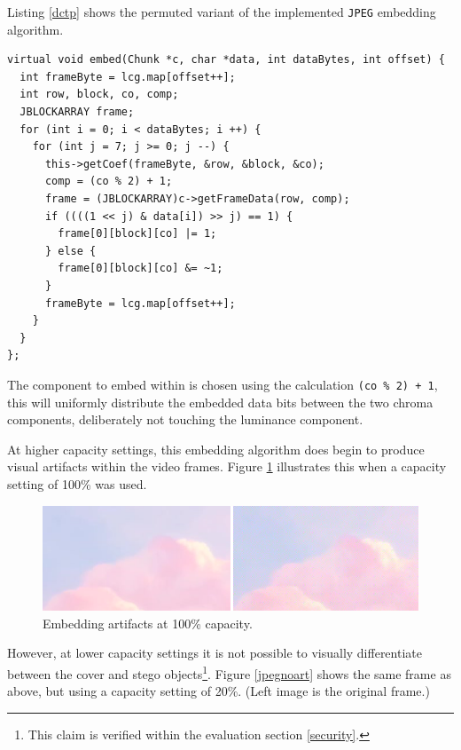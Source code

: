 \documentclass[paper=a4, fontsize=11pt,twoside]{scrartcl}
\numberwithin{table}{section}
\numberwithin{figure}{section}
\numberwithin{algorithm}{section}
\begin{document}
Listing \ref{dctp} shows the permuted variant of the implemented \texttt{JPEG} embedding algorithm.\\

\begin{lstlisting}[caption={Permuted \texttt{JPEG} embedding algorithm (\texttt{steg/dctp\_algorithm.cc:48}).}, frame=single, label=dctp,upquote=true,float,floatplacement=!h]
virtual void embed(Chunk *c, char *data, int dataBytes, int offset) {
  int frameByte = lcg.map[offset++];
  int row, block, co, comp;
  JBLOCKARRAY frame; 
  for (int i = 0; i < dataBytes; i ++) {
    for (int j = 7; j >= 0; j --) {
      this->getCoef(frameByte, &row, &block, &co);
      comp = (co % 2) + 1;
      frame = (JBLOCKARRAY)c->getFrameData(row, comp);
      if ((((1 << j) & data[i]) >> j) == 1) {
        frame[0][block][co] |= 1;
      } else {
        frame[0][block][co] &= ~1;
      }
      frameByte = lcg.map[offset++];
    }
  }
};
\end{lstlisting}

The component to embed within is chosen using the calculation \texttt{(co \% 2) + 1}, this will uniformly distribute the embedded data bits between the two chroma components, deliberately not touching the luminance component. 

At higher capacity settings, this embedding algorithm does begin to produce visual artifacts within the video frames. Figure \ref{jpegarti} illustrates this when a capacity setting of 100\% was used.

\begin{figure}[!h]
\centerline{\includegraphics[width=\textwidth]{images/bb_100cap.png}}
\caption{Embedding artifacts at 100\% capacity.}
\label{jpegarti}
\end{figure}

However, at lower capacity settings it is not possible to visually differentiate between the cover and stego objects\footnote{This claim is verified within the evaluation section \ref{security}.}. Figure \ref{jpegnoart} shows the same frame as above, but using a capacity setting of 20\%. (Left image is the original frame.)
\end{document}
